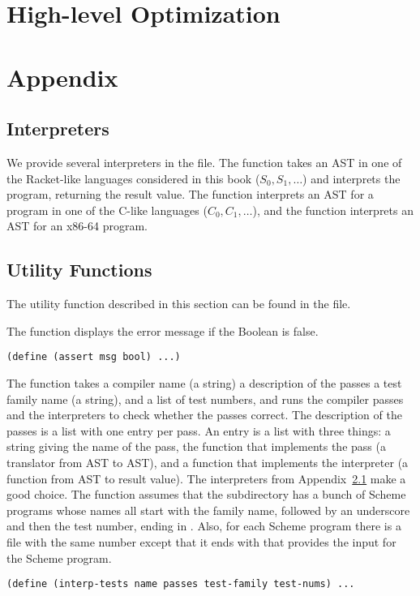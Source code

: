 \documentclass[12pt]{book}
\begin{document}
\chapter{High-level Optimization}
\label{ch:high-level-optimization}

\chapter{Appendix}

\section{Interpreters}
\label{appendix:interp}

We provide several interpreters in the  file.  The
 function takes an AST in one of the Racket-like
languages considered in this book ($S_0, S_1, \ldots$) and interprets
the program, returning the result value.  The  function
interprets an AST for a program in one of the C-like languages ($C_0,
C_1, \ldots$), and the  function interprets an AST for
an x86-64 program.

\section{Utility Functions}
\label{appendix:utilities}

The utility function described in this section can be found in the
 file.

The  function displays the error message  if the
Boolean  is false.
\begin{lstlisting}
(define (assert msg bool) ...)
\end{lstlisting}

The  function takes a compiler name (a string) a
description of the passes a test family name (a string), and a list of
test numbers, and runs the compiler passes and the interpreters to
check whether the passes correct. The description of the passes is a
list with one entry per pass.  An entry is a list with three things: a
string giving the name of the pass, the function that implements the
pass (a translator from AST to AST), and a function that implements
the interpreter (a function from AST to result value).  The
interpreters from Appendix~\ref{appendix:interp} make a good choice.
The  function assumes that the subdirectory
 has a bunch of Scheme programs whose names all start with
the family name, followed by an underscore and then the test number,
ending in . Also, for each Scheme program there is a file
with the same number except that it ends with  that provides
the input for the Scheme program.
\begin{lstlisting}
(define (interp-tests name passes test-family test-nums) ...
\end{lstlisting}
\end{document}
